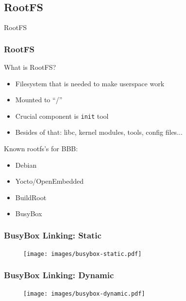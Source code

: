 \documentclass[aspectratio=169]{beamer}
\begin{document}
\subsection{RootFS}

\begin{frame}[standout]
  RootFS
\end{frame}

\begin{frame}
  \frametitle{RootFS}
  What is RootFS?
  \begin{itemize}
  \item Filesystem that is needed to make userspace work
  \item Mounted to ``/''
  \item Crucial component is \texttt{init} tool
  \item Besides of that: libc, kernel modules, tools, config files...
  \end{itemize}
  \pause
  Known rootfs's for BBB:
  \begin{itemize}
  \item Debian
  \item Yocto/OpenEmbedded
  \item BuildRoot
  \item BusyBox
  \end{itemize}
\end{frame}

\begin{frame}
  \frametitle{BusyBox Linking: Static}
  \begin{overlayarea}{\textwidth}{\textheight}
    \begin{figure}
      \centering
      \texttt{[image: images/busybox-static.pdf]}
    \end{figure}
  \end{overlayarea}
  \vspace*{-10mm}
\end{frame}

\begin{frame}
  \frametitle{BusyBox Linking: Dynamic}
  \begin{overlayarea}{\textwidth}{\textheight}
    \begin{figure}
      \centering
      \texttt{[image: images/busybox-dynamic.pdf]}
    \end{figure}
  \end{overlayarea}
  \vspace*{-10mm}
\end{frame}
\end{document}
